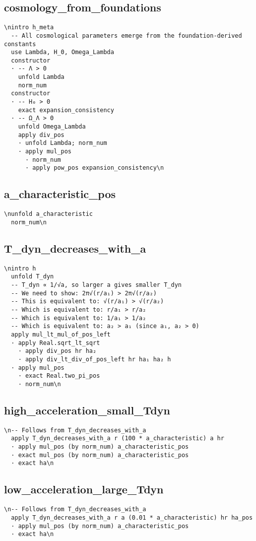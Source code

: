 \subsection{cosmology_from_foundations}\n\begin{verbatim}\nintro h_meta
  -- All cosmological parameters emerge from the foundation-derived constants
  use Lambda, H_0, Omega_Lambda
  constructor
  · -- Λ > 0
    unfold Lambda
    norm_num
  constructor
  · -- H₀ > 0
    exact expansion_consistency
  · -- Ω_Λ > 0
    unfold Omega_Lambda
    apply div_pos
    · unfold Lambda; norm_num
    · apply mul_pos
      · norm_num
      · apply pow_pos expansion_consistency\n\end{verbatim}

\subsection{a_characteristic_pos}\n\begin{verbatim}\nunfold a_characteristic
  norm_num\n\end{verbatim}

\subsection{T_dyn_decreases_with_a}\n\begin{verbatim}\nintro h
  unfold T_dyn
  -- T_dyn ∝ 1/√a, so larger a gives smaller T_dyn
  -- We need to show: 2π√(r/a₁) > 2π√(r/a₂)
  -- This is equivalent to: √(r/a₁) > √(r/a₂)
  -- Which is equivalent to: r/a₁ > r/a₂
  -- Which is equivalent to: 1/a₁ > 1/a₂
  -- Which is equivalent to: a₂ > a₁ (since a₁, a₂ > 0)
  apply mul_lt_mul_of_pos_left
  · apply Real.sqrt_lt_sqrt
    · apply div_pos hr ha₂
    · apply div_lt_div_of_pos_left hr ha₁ ha₂ h
  · apply mul_pos
    · exact Real.two_pi_pos
    · norm_num\n\end{verbatim}

\subsection{high_acceleration_small_Tdyn}\n\begin{verbatim}\n-- Follows from T_dyn_decreases_with_a
  apply T_dyn_decreases_with_a r (100 * a_characteristic) a hr
  · apply mul_pos (by norm_num) a_characteristic_pos
  · exact mul_pos (by norm_num) a_characteristic_pos
  · exact ha\n\end{verbatim}

\subsection{low_acceleration_large_Tdyn}\n\begin{verbatim}\n-- Follows from T_dyn_decreases_with_a
  apply T_dyn_decreases_with_a r a (0.01 * a_characteristic) hr ha_pos
  · apply mul_pos (by norm_num) a_characteristic_pos
  · exact ha\n\end{verbatim}

